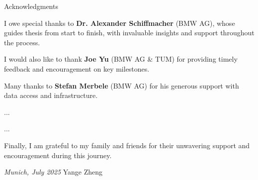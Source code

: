 \thispagestyle{empty}

\vspace*{20mm}

\begin{center}
    { Acknowledgments}
\end{center}

\vspace{10mm}


I owe special thanks to \textbf{Dr. Alexander Schiffmacher} (BMW AG), whose guides thesis from start to finish, with invaluable insights and support throughout the process. 

I would also like to thank \textbf{Joe Yu} (BMW AG \& TUM) for providing timely feedback and encouragement on key milestones.

Many thanks to \textbf{Stefan Merbele} (BMW AG) for his generous support with data access and infrastructure.

...

...

Finally, I am grateful to my family and friends for their unwavering support and encouragement during this journey.

\bigskip
\noindent
\emph{Munich, July 2025} \hfill Yange Zheng


\cleardoublepage{}
